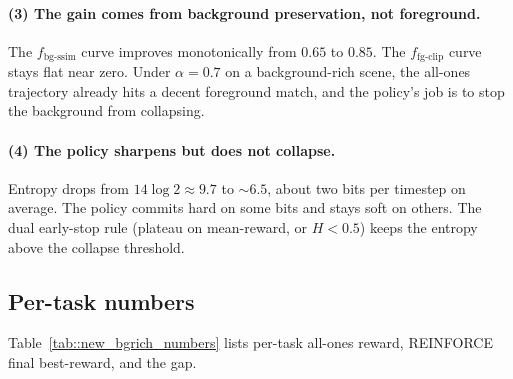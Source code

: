 \paragraph{(3) The gain comes from background preservation, not foreground.} The $f_{\text{bg-ssim}}$ curve improves monotonically from $0.65$ to $0.85$. The $f_{\text{fg-clip}}$ curve stays flat near zero. Under $\alpha=0.7$ on a background-rich scene, the all-ones trajectory already hits a decent foreground match, and the policy's job is to stop the background from collapsing.

\paragraph{(4) The policy sharpens but does not collapse.} Entropy drops from $14\log 2 \approx 9.7$ to $\sim 6.5$, about two bits per timestep on average. The policy commits hard on some bits and stays soft on others. The dual early-stop rule (plateau on mean-reward, or $H<0.5$) keeps the entropy above the collapse threshold.

\subsection{Per-task numbers}

Table~\ref{tab::new_bgrich_numbers} lists per-task all-ones reward, REINFORCE final best-reward, and the gap.

